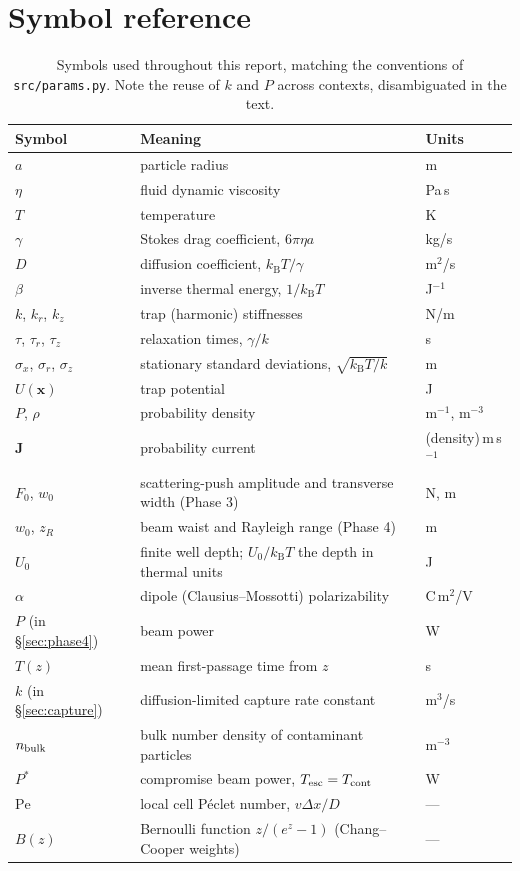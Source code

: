 \documentclass[11pt]{article}
\newcommand{\kB}{k_{\mathrm{B}}}
\begin{document}
\section{Symbol reference}

\begin{table}[h]
\centering
\begin{tabular}{@{}lll@{}}
\toprule
Symbol & Meaning & Units \\
\midrule
$a$ & particle radius & m \\
$\eta$ & fluid dynamic viscosity & Pa\,s \\
$T$ & temperature & K \\
$\gamma$ & Stokes drag coefficient, $6\pi\eta a$ & kg/s \\
$D$ & diffusion coefficient, $\kB T/\gamma$ & m$^2$/s \\
$\beta$ & inverse thermal energy, $1/\kB T$ & J$^{-1}$ \\
$k$, $k_r$, $k_z$ & trap (harmonic) stiffnesses & N/m \\
$\tau$, $\tau_r$, $\tau_z$ & relaxation times, $\gamma/k$ & s \\
$\sigma_x$, $\sigma_r$, $\sigma_z$ & stationary standard deviations, $\sqrt{\kB T/k}$ & m \\
$U(\mathbf x)$ & trap potential & J \\
$P$, $\rho$ & probability density & m$^{-1}$, m$^{-3}$ \\
$\mathbf J$ & probability current & (density)\,m\,s$^{-1}$ \\
$F_0$, $w_0$ & scattering-push amplitude and transverse width (Phase 3) & N, m \\
$w_0$, $z_R$ & beam waist and Rayleigh range (Phase 4) & m \\
$U_0$ & finite well depth; $U_0/\kB T$ the depth in thermal units & J \\
$\alpha$ & dipole (Clausius--Mossotti) polarizability & C\,m$^2$/V \\
$P$ (in \S\ref{sec:phase4}) & beam power & W \\
$T(z)$ & mean first-passage time from $z$ & s \\
$k$ (in \S\ref{sec:capture}) & diffusion-limited capture rate constant & m$^3$/s \\
$n_{\rm bulk}$ & bulk number density of contaminant particles & m$^{-3}$ \\
$P^{*}$ & compromise beam power, $T_{\rm esc}=T_{\rm cont}$ & W \\
$\mathrm{Pe}$ & local cell P\'eclet number, $v\Delta x/D$ & --- \\
$B(z)$ & Bernoulli function $z/(e^z-1)$ (Chang--Cooper weights) & --- \\
\bottomrule
\end{tabular}
\caption{Symbols used throughout this report, matching the conventions of \texttt{src/params.py}. Note the reuse of $k$ and $P$ across contexts, disambiguated in the text.}
\end{table}
\end{document}
